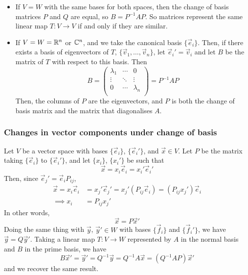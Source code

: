 \documentclass{../../template/note}
\begin{document}
    \begin{remark*}
        \begin{itemize}
            \item If \(V = W\) with the same bases for both spaces, then the change of basis matrices \(P\) and \(Q\) are equal, so \(B = P^{-1}AP\). So matrices represent the same linear map \(T: V \to V\) if and only if they are similar.
            \item If \(V = W = \mathbb R^n\) or \(\mathbb C^n\), and we take the canonical basis \(\{\vec e_i\}\). Then, if there exists a basis of eigenvectors of \(T\), \(\{\vec v_1, \dots, \vec v_n\}\), let \(\vec e_i' = \vec v_i\) and let \(B\) be the matrix of \(T\) with respect to this basis. Then
            \[
                B = \begin{pmatrix}
                 \lambda_1 & \cdots & 0 \\
                 \vdots & \ddots & \vdots \\
                 0 & \cdots & \lambda_n \\
                \end{pmatrix} = P^{-1}AP
            \]
            Then, the columns of \(P\) are the eigenvectors, and \(P\) is both the change of basis matrix and the matrix that diagonalises \(A\).
        \end{itemize}
    \end{remark*}

    
    \subsubsection{Changes in vector components under change of basis}
    
    Let \(V\) be a vector space with bases \(\{\vec e_i\}\), \(\{\vec e_i'\}\), and \(\vec x \in V\). Let \(P\) be the matrix taking \(\{\vec e_i\}\) to \(\{\vec e_i'\}\), and let \(\{x_i\}\), \(\{x_i'\}\) be such that
    \[
        \vec x = x_i \vec e_i = x_i' \vec e_i'
    \]
    Then, since \(\vec e_j' = \vec e_i P_{ij}\),
    \begin{align*}
        \vec x = x_i \vec e_i &= x_j' \vec e_j' = x_j'(P_{ij} \vec e_i) = (P_{ij}x_j')\vec e_i \\
        \implies x_i &= P_{ij} x_j'
    \end{align*}
    In other words,
    \[
        \vec x = P \vec x'
    \]
    Doing the same thing with \(\vec y\), \(\vec y' \in W\) with bases \(\{\vec f_i\}\) and \(\{\vec f_i'\}\), we have \(\vec y = Q\vec y'\). Taking a linear map \(T: V \to W\) represented by \(A\) in the normal basis and \(B\) in the prime basis, we have
    \[
        B \vec x' = \vec y' = Q^{-1} \vec y = Q^{-1}A \vec x = (Q^{-1}AP) \vec x'
    \]
    and we recover the same result.
\end{document}
